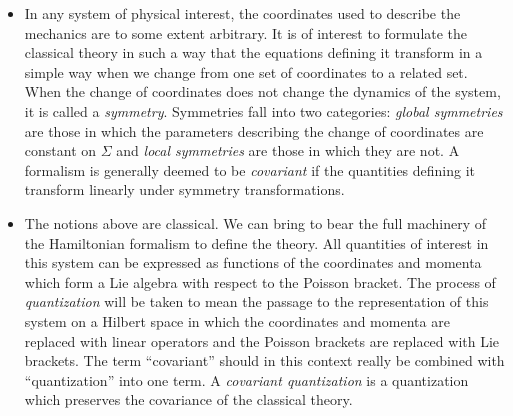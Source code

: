 \documentclass[12pt]{article}
\def\SO#1{\mathrm{SO}(#1)}
\begin{document}
\begin{itemize}
 A super-manifold is then one which has local charts which generalize in the natural way that of manifolds. A {\em super-field} is a function on such a super-manifold $F(x, \theta)$. We assume it is analytic in the fermionic coordinate. Since the spinor representation is finite dimensional and since the fermionic coordinates anti-commute, a superfield can be expanded into ordinary functions called {\em component fields} $F(x,\theta)= f(x)+\psi_\mu(x) \theta^\mu+\dots$ and the expansion terminates. Note that the spins and statistics of the component fields are fixed by those of the superfield $F$ by the properties of the Gra\ss man coordinates: For example, if $F$ is a spin-0 bosonic function meaning that it is a commuting singlet of $\SO{d-1,1}$ then $f$ is a commuting spin-0 component, $\psi_\mu$ is an {\em anti}-commuting spin-$\frac12$, etc.
\item In any system of physical interest, the coordinates used to describe the mechanics are to some extent arbitrary. It is of interest to formulate the classical theory in such a way that the equations defining it transform in a simple way when we change from one set of coordinates to a related set. When the change of coordinates does not change the dynamics of the system, it is called a {\em symmetry}. Symmetries fall into two categories: {\em global symmetries} are those in which the parameters describing the change of coordinates are constant on $\Sigma$ and {\em local symmetries} are those in which they are not. A formalism is generally deemed to be {\em covariant} if the quantities defining it transform linearly under symmetry transformations. 
\item The notions above are classical. We can bring to bear the full machinery of the Hamiltonian formalism to define the theory. All quantities of interest in this system can be expressed as functions of the coordinates and momenta which form a Lie algebra with respect to the Poisson bracket. 
The process of {\em quantization} will be taken to mean the passage to the representation of this system on a Hilbert space in which the coordinates and momenta are replaced with linear operators and the Poisson brackets are replaced with Lie brackets.
The term ``covariant'' should in this context really be combined with ``quantization'' into one term. A {\em covariant quantization} is a quantization which preserves the covariance of the classical theory.
\end{itemize}
\end{document}

